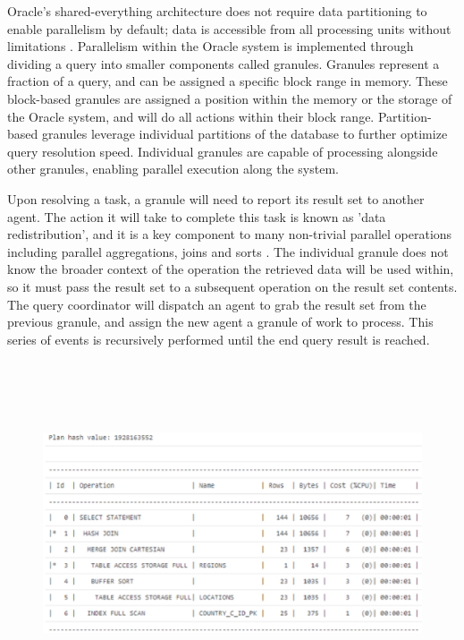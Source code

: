 \documentclass[onecolumn, draftclsnofoot,10pt, compsoc]{IEEEtran}
\begin{document}
\indent Oracle’s shared-everything architecture does not require data partitioning to enable parallelism by default; data is accessible from all processing units without limitations \cite{OraclePEwODF}. 
Parallelism within the Oracle system is implemented through dividing a query into smaller components called granules.
Granules represent a fraction of a query, and can be assigned a specific block range in memory.
These block-based granules are assigned a position within the memory or the storage of the Oracle system, and will do all actions within their block range.
Partition-based granules leverage individual partitions of the database to further optimize query resolution speed.
Individual granules are capable of processing alongside other granules, enabling parallel execution along the system. 


\indent Upon resolving a task, a granule will need to report its result set to another agent. 
The action it will take to complete this task is known as 'data redistribution', and it is a key component to many non-trivial parallel operations including parallel aggregations, joins and sorts \cite{OraclePEwODF}.
The individual granule does not know the broader context of the operation the retrieved data will be used within, so it must pass the result set to a subsequent operation on the result set contents.
The query coordinator will dispatch an agent to grab the result set from the previous granule, and assign the new agent a granule of work to process.
This series of events is recursively performed until the end query result is reached.

\begin{figure}[ht]
    \centering
    \includegraphics[width=6in, height=4in, keepaspectratio]{nickImage.eps}
\end{figure}
\end{document}

